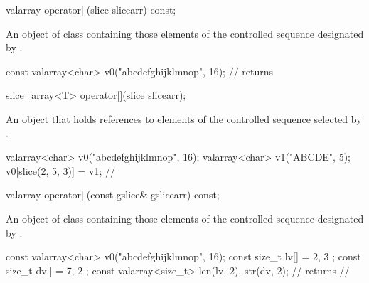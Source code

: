 %
\begin{itemdecl}
valarray operator[](slice slicearr) const;
\end{itemdecl}

\begin{itemdescr}
\pnum
\returns An object of class  containing those
elements of the controlled sequence designated by .
\begin{example}
\begin{codeblock}
const valarray<char> v0("abcdefghijklmnop", 16);
//  returns 
\end{codeblock}
\end{example}
\end{itemdescr}

%
\begin{itemdecl}
slice_array<T> operator[](slice slicearr);
\end{itemdecl}

\begin{itemdescr}
\pnum
\returns An object that holds references to elements of the controlled
sequence selected by . \begin{example}
\begin{codeblock}
valarray<char> v0("abcdefghijklmnop", 16);
valarray<char> v1("ABCDE", 5);
v0[slice(2, 5, 3)] = v1;
// 
\end{codeblock}
\end{example}
\end{itemdescr}

%
\begin{itemdecl}
valarray operator[](const gslice& gslicearr) const;
\end{itemdecl}

\begin{itemdescr}
\pnum
\returns An object of class  containing those
elements of the controlled sequence designated by .
\begin{example}
\begin{codeblock}
const valarray<char> v0("abcdefghijklmnop", 16);
const size_t lv[] = { 2, 3 };
const size_t dv[] = { 7, 2 };
const valarray<size_t> len(lv, 2), str(dv, 2);
//  returns
// 
\end{codeblock}
\end{example}
\end{itemdescr}

